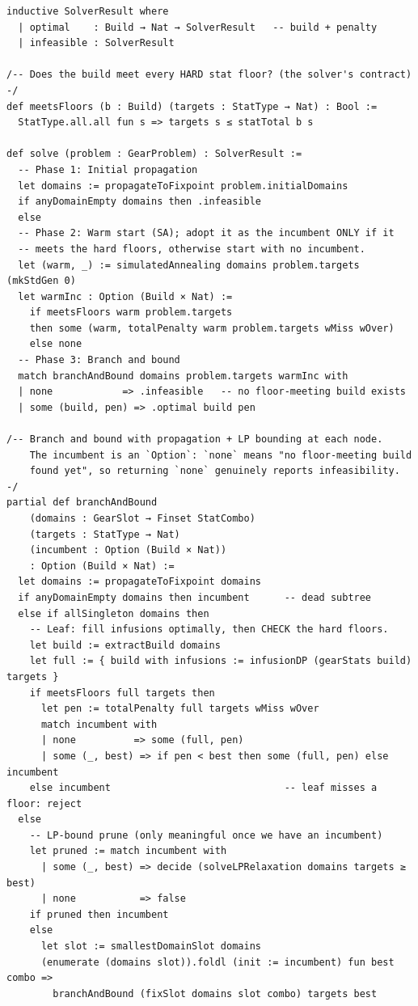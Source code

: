 \documentclass[11pt, a4paper, oneside]{book}
\begin{document}
\begin{leanbox}[title={Lean 4 (Mathlib) --- The Complete Solver}]
\begin{verbatim}
inductive SolverResult where
  | optimal    : Build → Nat → SolverResult   -- build + penalty
  | infeasible : SolverResult

/-- Does the build meet every HARD stat floor? (the solver's contract) -/
def meetsFloors (b : Build) (targets : StatType → Nat) : Bool :=
  StatType.all.all fun s => targets s ≤ statTotal b s

def solve (problem : GearProblem) : SolverResult :=
  -- Phase 1: Initial propagation
  let domains := propagateToFixpoint problem.initialDomains
  if anyDomainEmpty domains then .infeasible
  else
  -- Phase 2: Warm start (SA); adopt it as the incumbent ONLY if it
  -- meets the hard floors, otherwise start with no incumbent.
  let (warm, _) := simulatedAnnealing domains problem.targets (mkStdGen 0)
  let warmInc : Option (Build × Nat) :=
    if meetsFloors warm problem.targets
    then some (warm, totalPenalty warm problem.targets wMiss wOver)
    else none
  -- Phase 3: Branch and bound
  match branchAndBound domains problem.targets warmInc with
  | none            => .infeasible   -- no floor-meeting build exists
  | some (build, pen) => .optimal build pen

/-- Branch and bound with propagation + LP bounding at each node.
    The incumbent is an `Option`: `none` means "no floor-meeting build
    found yet", so returning `none` genuinely reports infeasibility. -/
partial def branchAndBound
    (domains : GearSlot → Finset StatCombo)
    (targets : StatType → Nat)
    (incumbent : Option (Build × Nat))
    : Option (Build × Nat) :=
  let domains := propagateToFixpoint domains
  if anyDomainEmpty domains then incumbent      -- dead subtree
  else if allSingleton domains then
    -- Leaf: fill infusions optimally, then CHECK the hard floors.
    let build := extractBuild domains
    let full := { build with infusions := infusionDP (gearStats build) targets }
    if meetsFloors full targets then
      let pen := totalPenalty full targets wMiss wOver
      match incumbent with
      | none          => some (full, pen)
      | some (_, best) => if pen < best then some (full, pen) else incumbent
    else incumbent                              -- leaf misses a floor: reject
  else
    -- LP-bound prune (only meaningful once we have an incumbent)
    let pruned := match incumbent with
      | some (_, best) => decide (solveLPRelaxation domains targets ≥ best)
      | none           => false
    if pruned then incumbent
    else
      let slot := smallestDomainSlot domains
      (enumerate (domains slot)).foldl (init := incumbent) fun best combo =>
        branchAndBound (fixSlot domains slot combo) targets best
\end{verbatim}
\end{leanbox}
\end{document}
